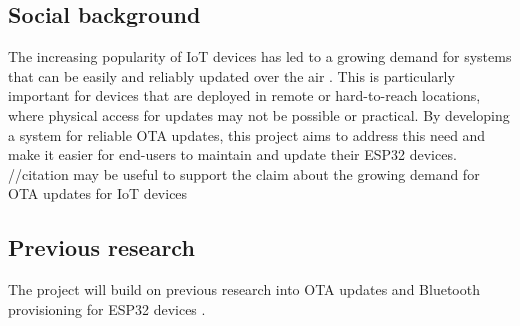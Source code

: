 \subsection{Social background}
\label{sec:social}
The increasing popularity of IoT devices has led to a growing demand for systems that can be easily and reliably updated over the air \cite{Villegas:2019}. This is particularly important for devices that are deployed in remote or hard-to-reach locations, where physical access for updates may not be possible or practical. By developing a system for reliable OTA updates, this project aims to address this need and make it easier for end-users to maintain and update their ESP32 devices. //citation may be useful to support the claim about the growing demand for OTA updates for IoT devices

\subsection{Previous research}
\label{sec:previous}
The project will build on previous research into OTA updates and Bluetooth provisioning for ESP32 devices \cite{espressif:esp-idf-programming-guide}.